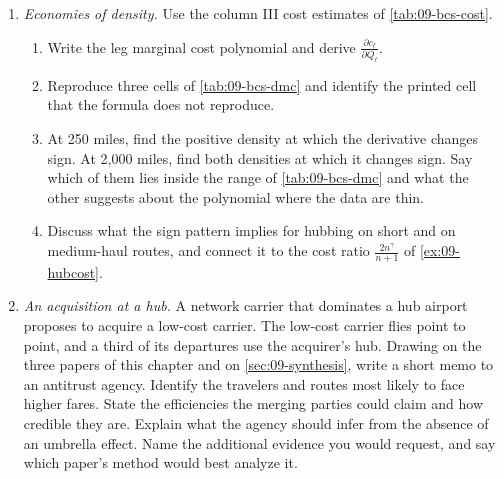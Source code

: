\begin{enumerate}[label=\arabic*., leftmargin=*, itemsep=6pt]
\item \emph{Economies of density.} Use the column III cost estimates of \cref{tab:09-bcs-cost}.
\begin{enumerate}[label=(\alph*)]
\item Write the leg marginal cost polynomial and derive $\frac{\partial c_\ell}{\partial Q_\ell}$.
\item Reproduce three cells of \cref{tab:09-bcs-dmc} and identify the printed cell that the formula does not
reproduce.
\item At 250 miles, find the positive density at which the derivative changes sign. At 2,000 miles, find
both densities at which it changes sign. Say which of them lies inside the range of \cref{tab:09-bcs-dmc}
and what the other suggests about the polynomial where the data are thin.
\item Discuss what the sign pattern implies for hubbing on short and on medium-haul routes, and connect it to
the cost ratio $\frac{2n^\gamma}{n+1}$ of \cref{ex:09-hubcost}.
\end{enumerate}

\item \emph{An acquisition at a hub.} A network carrier that dominates a hub airport proposes to acquire a
low-cost carrier. The low-cost carrier flies point to point, and a third of its departures use the
acquirer's hub. Drawing on the three papers of this chapter and on \cref{sec:09-synthesis}, write a short
memo to an antitrust agency. Identify the travelers and routes most likely to face higher fares. State the
efficiencies the merging parties could claim and how credible they are. Explain what the agency should
infer from the absence of an umbrella effect. Name the additional evidence you would request, and say which
paper's method would best analyze it.

\end{enumerate}
